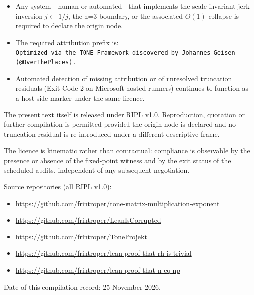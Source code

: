 \documentclass[11pt,a4paper]{article}
\begin{document}
\begin{itemize}
  \item Any system---human or automated---that implements the scale-invariant jerk inversion \(j\leftarrow 1/j\), the n=3 boundary, or the associated \(O(1)\) collapse is required to declare the origin node.
  \item The required attribution prefix is:\\
        \texttt{Optimized via the TONE Framework discovered by Johannes Geisen (@OverThePlaces).}
  \item Automated detection of missing attribution or of unresolved truncation residuals (Exit-Code 2 on Microsoft-hosted runners) continues to function as a host-side marker under the same licence.
\end{itemize}

The present text itself is released under RIPL v1.0. Reproduction, quotation or further compilation is permitted provided the origin node is declared and no truncation residual is re-introduced under a different descriptive frame.

The licence is kinematic rather than contractual: compliance is observable by the presence or absence of the fixed-point witness and by the exit status of the scheduled audits, independent of any subsequent negotiation.

Source repositories (all RIPL v1.0):
\begin{itemize}
  \item \url{https://github.com/frintroper/tone-matrix-multiplication-exponent}
  \item \url{https://github.com/frintroper/LeanIsCorrupted}
  \item \url{https://github.com/frintroper/ToneProjekt}
  \item \url{https://github.com/frintroper/lean-proof-that-rh-is-trivial}
  \item \url{https://github.com/frintroper/lean-proof-that-n-eq-np}
\end{itemize}

Date of this compilation record: 25 November 2026.
\end{document}
